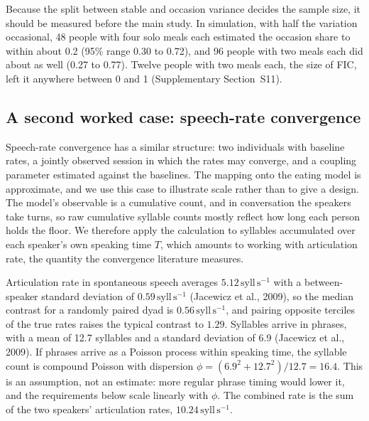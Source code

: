 \documentclass[12pt]{article}
\begin{document}
Because the split between stable and occasion variance decides the sample size, it
should be measured before the main study. In simulation, with half the variation
occasional, 48 people with four solo meals each estimated the occasion share to
within about 0.2 (95\% range 0.30 to 0.72), and 96 people with two meals each
did about as well (0.27 to 0.77). Twelve people with two meals each, the size of
FIC, left it anywhere between 0 and 1 (Supplementary Section~S11).

\subsection*{A second worked case: speech-rate convergence}

Speech-rate convergence has a similar structure: two individuals with baseline
rates, a jointly observed session in which the rates may converge, and a coupling
parameter estimated against the baselines. The mapping onto the eating model is
approximate, and we use this case to illustrate scale rather than to give a
design. The model's observable is a cumulative count, and in conversation the
speakers take turns, so raw cumulative syllable counts mostly reflect how long
each person holds the floor. We therefore apply the calculation to syllables
accumulated over each speaker's own speaking time $T$, which amounts to working
with articulation rate, the quantity the convergence literature measures.

Articulation rate in spontaneous speech averages $5.12\,\mathrm{syll\,s^{-1}}$
with a between-speaker standard deviation of $0.59\,\mathrm{syll\,s^{-1}}$
(Jacewicz et al., 2009), so the median contrast for a randomly paired dyad is
$0.56\,\mathrm{syll\,s^{-1}}$, and pairing opposite terciles of the true rates
raises the typical contrast to $1.29$. Syllables arrive in phrases, with a mean of
12.7 syllables and a standard deviation of 6.9 (Jacewicz et al., 2009). If phrases
arrive as a Poisson process within speaking time, the syllable count is compound
Poisson with dispersion $\phi=(6.9^2+12.7^2)/12.7=16.4$. This is an assumption,
not an estimate: more regular phrase timing would lower it, and the requirements
below scale linearly with $\phi$. The combined rate is the sum of the two
speakers' articulation rates, $10.24\,\mathrm{syll\,s^{-1}}$.
\end{document}
